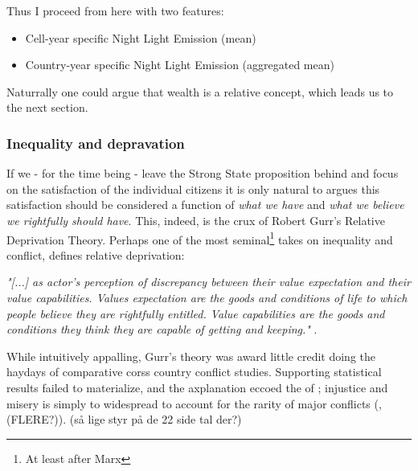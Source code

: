 \documentclass[a4paper]{article}
\begin{document}
 Thus I proceed from here with two features:
 
 \begin{itemize}
     \item Cell-year specific Night Light Emission (mean)
     \item Country-year specific Night Light Emission (aggregated mean) 
 \end{itemize}

Naturrally one could argue that wealth is a relative concept, which leads us to the next section.

\subsubsection{Inequality and depravation} %

If we - for the time being - leave the Strong State proposition behind and focus on the satisfaction of the individual citizens it is only natural to argues this satisfaction should be considered a function of \emph{what we have} and \emph{what we believe we rightfully should have}. This, indeed, is the crux of Robert Gurr's \citeyearpar{Gurr_1970} Relative Deprivation Theory. Perhaps one of the most seminal\footnote{At least after Marx} takes on inequality and conflict, \cite{Gurr_1970} defines relative deprivation: 

\begin{displayquote}
\emph{"[...] as actor's perception of discrepancy between their value expectation and their value capabilities. Values expectation are the goods and conditions of life to which people believe they are rightfully entitled. Value capabilities are the goods and conditions they think they are capable of getting and keeping."} \citep[24]{Gurr_1970}. 
\end{displayquote}

While intuitively appalling, Gurr's theory was award little credit doing the haydays of comparative corss country conflict studies. Supporting statistical results failed to materialize, and the axplanation eccoed the of \cite[11]{Skocpol_1979}; injustice and misery is simply to widespread to account for the rarity of major conflicts (\citealp[p. 22]{Collier_Hoeffler_1998},  \citealp[p. 22]{Collier_Hoeffler_2004} \citealp[p. 44]{Fearon_Laitin_2003}(FLERE?)). (så lige styr på de 22 side tal der?)
\end{document}
